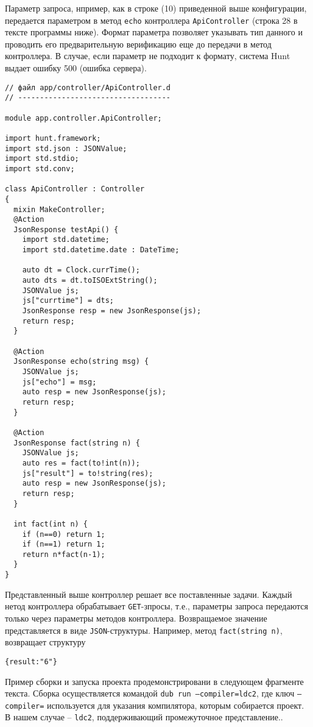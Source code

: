 \documentclass{studrep}
\begin{document}
Параметр запроса, нпример, как в строке (10) приведенной выше конфигурации, передается параметром в метод \verb|echo| контроллера \verb|ApiController| (строка 28 в тексте программы ниже).  Формат параметра позволяет указывать тип данного и проводить его предварительную верификацию еще до передачи в метод контроллера.  В случае, если параметр не подходит к формату, система Hunt выдает ошибку 500 (ошибка сервера).
\begin{verbatim}
// файл app/controller/ApiController.d
// -----------------------------------

module app.controller.ApiController;

import hunt.framework;
import std.json : JSONValue;
import std.stdio;
import std.conv;

class ApiController : Controller
{
  mixin MakeController;
  @Action
  JsonResponse testApi() {
    import std.datetime;
    import std.datetime.date : DateTime;

    auto dt = Clock.currTime();
    auto dts = dt.toISOExtString();
    JSONValue js;
    js["currtime"] = dts;
    JsonResponse resp = new JsonResponse(js);
    return resp;
  }

  @Action
  JsonResponse echo(string msg) {
    JSONValue js;
    js["echo"] = msg;
    auto resp = new JsonResponse(js);
    return resp;
  }

  @Action
  JsonResponse fact(string n) {
    JSONValue js;
    auto res = fact(to!int(n));
    js["result"] = to!string(res);
    auto resp = new JsonResponse(js);
    return resp;
  }

  int fact(int n) {
    if (n==0) return 1;
    if (n==1) return 1;
    return n*fact(n-1);
  }
}
\end{verbatim}

Представленный выше контроллер решает все поставленные задачи.  Каждый нетод контроллера обрабатывает \verb|GET|-зпросы, т.е., параметры запроса передаются только через параметры методов контроллера.  Возвращаемое значение представляется в виде \verb|JSON|-структуры.  Например, метод \verb|fact(string n)|, возвращает структуру
\begin{verbatim}
{result:"6"}
\end{verbatim}

Пример сборки и запуска проекта продемонстрировани в следующем фрагменте текста.  Сборка осуществляется командой \texttt{dub run --compiler=ldc2}, где ключ \texttt{--compiler=} используется для указания компилятора, которым собирается проект.  В нашем случае -- \texttt{ldc2}, поддерживающий промежуточное представление..
\end{document}

